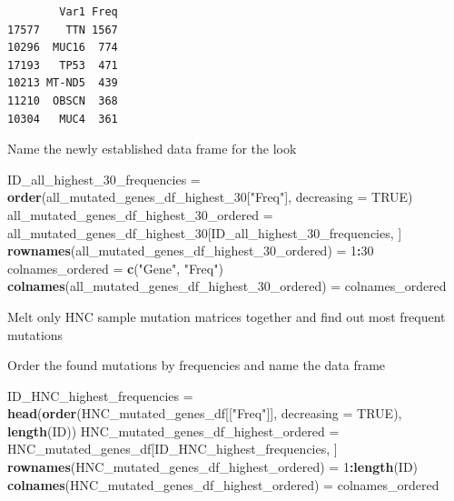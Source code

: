 \documentclass[]{article}
\newenvironment{Shaded}{\begin{snugshade}}{\end{snugshade}}
\newcommand{\KeywordTok}[1]{\textcolor[rgb]{0.13,0.29,0.53}{\textbf{#1}}}
\newcommand{\DataTypeTok}[1]{\textcolor[rgb]{0.13,0.29,0.53}{#1}}
\newcommand{\DecValTok}[1]{\textcolor[rgb]{0.00,0.00,0.81}{#1}}
\newcommand{\StringTok}[1]{\textcolor[rgb]{0.31,0.60,0.02}{#1}}
\newcommand{\OtherTok}[1]{\textcolor[rgb]{0.56,0.35,0.01}{#1}}
\newcommand{\OperatorTok}[1]{\textcolor[rgb]{0.81,0.36,0.00}{\textbf{#1}}}
\newcommand{\NormalTok}[1]{#1}
\begin{document}
\begin{verbatim}
        Var1 Freq
17577    TTN 1567
10296  MUC16  774
17193   TP53  471
10213 MT-ND5  439
11210  OBSCN  368
10304   MUC4  361
\end{verbatim}

Name the newly established data frame for the look

\begin{Shaded}
\begin{Highlighting}[]
\NormalTok{ID_all_highest_30_frequencies =}\StringTok{ }\KeywordTok{order}\NormalTok{(all_mutated_genes_df_highest_}\DecValTok{30}\NormalTok{[}\StringTok{"Freq"}\NormalTok{], }\DataTypeTok{decreasing =} \OtherTok{TRUE}\NormalTok{)}
\NormalTok{all_mutated_genes_df_highest_30_ordered =}\StringTok{ }\NormalTok{all_mutated_genes_df_highest_}\DecValTok{30}\NormalTok{[ID_all_highest_30_frequencies, ]}
\KeywordTok{rownames}\NormalTok{(all_mutated_genes_df_highest_30_ordered) =}\StringTok{ }\DecValTok{1}\OperatorTok{:}\DecValTok{30}
\NormalTok{colnames_ordered =}\StringTok{ }\KeywordTok{c}\NormalTok{(}\StringTok{"Gene"}\NormalTok{, }\StringTok{"Freq"}\NormalTok{)}
\KeywordTok{colnames}\NormalTok{(all_mutated_genes_df_highest_30_ordered) =}\StringTok{ }\NormalTok{colnames_ordered}
\end{Highlighting}
\end{Shaded}

Melt only HNC sample mutation matrices together and find out most
frequent mutations

\begin{Shaded}
\end{Shaded}

Order the found mutations by frequencies and name the data frame

\begin{Shaded}
\begin{Highlighting}[]
\NormalTok{ID_HNC_highest_frequencies =}\StringTok{ }\KeywordTok{head}\NormalTok{(}\KeywordTok{order}\NormalTok{(HNC_mutated_genes_df[[}\StringTok{"Freq"}\NormalTok{]], }\DataTypeTok{decreasing =} \OtherTok{TRUE}\NormalTok{), }\KeywordTok{length}\NormalTok{(ID))}
\NormalTok{HNC_mutated_genes_df_highest_ordered =}\StringTok{ }\NormalTok{HNC_mutated_genes_df[ID_HNC_highest_frequencies, ]}
\KeywordTok{rownames}\NormalTok{(HNC_mutated_genes_df_highest_ordered) =}\StringTok{ }\DecValTok{1}\OperatorTok{:}\KeywordTok{length}\NormalTok{(ID)}
\KeywordTok{colnames}\NormalTok{(HNC_mutated_genes_df_highest_ordered) =}\StringTok{ }\NormalTok{colnames_ordered}
\end{Highlighting}
\end{Shaded}
\end{document}

